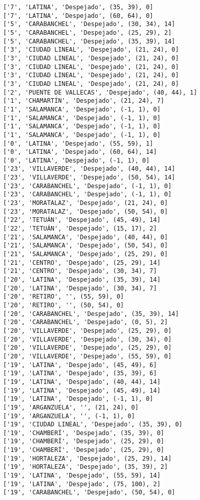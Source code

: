 \documentclass[11pt]{article}
\begin{document}
\begin{Verbatim}[commandchars=\\\{\}]
['7', 'LATINA', 'Despejado', (35, 39), 0]
['7', 'LATINA', 'Despejado', (60, 64), 0]
['5', 'CARABANCHEL', 'Despejado', (30, 34), 14]
['5', 'CARABANCHEL', 'Despejado', (25, 29), 2]
['5', 'CARABANCHEL', 'Despejado', (35, 39), 14]
['3', 'CIUDAD LINEAL', 'Despejado', (21, 24), 0]
['3', 'CIUDAD LINEAL', 'Despejado', (21, 24), 0]
['3', 'CIUDAD LINEAL', 'Despejado', (21, 24), 0]
['3', 'CIUDAD LINEAL', 'Despejado', (21, 24), 0]
['3', 'CIUDAD LINEAL', 'Despejado', (21, 24), 0]
['2', 'PUENTE DE VALLECAS', 'Despejado', (40, 44), 1]
['1', 'CHAMARTÍN', 'Despejado', (21, 24), 7]
['1', 'SALAMANCA', 'Despejado', (-1, 1), 0]
['1', 'SALAMANCA', 'Despejado', (-1, 1), 0]
['1', 'SALAMANCA', 'Despejado', (-1, 1), 0]
['1', 'SALAMANCA', 'Despejado', (-1, 1), 0]
['0', 'LATINA', 'Despejado', (55, 59), 1]
['0', 'LATINA', 'Despejado', (60, 64), 14]
['0', 'LATINA', 'Despejado', (-1, 1), 0]
['23', 'VILLAVERDE', 'Despejado', (40, 44), 14]
['23', 'VILLAVERDE', 'Despejado', (50, 54), 14]
['23', 'CARABANCHEL', 'Despejado', (-1, 1), 0]
['23', 'CARABANCHEL', 'Despejado', (-1, 1), 0]
['23', 'MORATALAZ', 'Despejado', (21, 24), 0]
['23', 'MORATALAZ', 'Despejado', (50, 54), 0]
['22', 'TETUÁN', 'Despejado', (45, 49), 14]
['22', 'TETUÁN', 'Despejado', (15, 17), 2]
['21', 'SALAMANCA', 'Despejado', (40, 44), 0]
['21', 'SALAMANCA', 'Despejado', (50, 54), 0]
['21', 'SALAMANCA', 'Despejado', (25, 29), 0]
['21', 'CENTRO', 'Despejado', (25, 29), 14]
['21', 'CENTRO', 'Despejado', (30, 34), 7]
['20', 'LATINA', 'Despejado', (35, 39), 14]
['20', 'LATINA', 'Despejado', (30, 34), 7]
['20', 'RETIRO', '', (55, 59), 0]
['20', 'RETIRO', '', (50, 54), 0]
['20', 'CARABANCHEL', 'Despejado', (35, 39), 14]
['20', 'CARABANCHEL', 'Despejado', (0, 5), 2]
['20', 'VILLAVERDE', 'Despejado', (25, 29), 0]
['20', 'VILLAVERDE', 'Despejado', (30, 34), 0]
['20', 'VILLAVERDE', 'Despejado', (25, 29), 0]
['20', 'VILLAVERDE', 'Despejado', (55, 59), 0]
['19', 'LATINA', 'Despejado', (45, 49), 6]
['19', 'LATINA', 'Despejado', (35, 39), 6]
['19', 'LATINA', 'Despejado', (40, 44), 14]
['19', 'LATINA', 'Despejado', (45, 49), 14]
['19', 'LATINA', 'Despejado', (-1, 1), 0]
['19', 'ARGANZUELA', '', (21, 24), 0]
['19', 'ARGANZUELA', '', (-1, 1), 0]
['19', 'CIUDAD LINEAL', 'Despejado', (35, 39), 0]
['19', 'CHAMBERÍ', 'Despejado', (35, 39), 0]
['19', 'CHAMBERÍ', 'Despejado', (25, 29), 0]
['19', 'CHAMBERÍ', 'Despejado', (25, 29), 0]
['19', 'HORTALEZA', 'Despejado', (25, 29), 14]
['19', 'HORTALEZA', 'Despejado', (35, 39), 2]
['19', 'LATINA', 'Despejado', (55, 59), 14]
['19', 'LATINA', 'Despejado', (75, 100), 2]
['19', 'CARABANCHEL', 'Despejado', (50, 54), 0]

\end{Verbatim}
\end{document}
